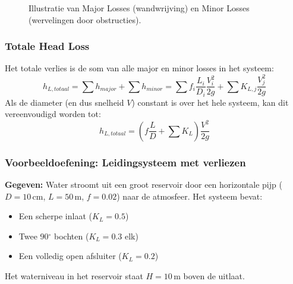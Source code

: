 \documentclass[a4paper,11pt,twoside]{report}
\begin{document}
\begin{figure}[H]
    \centering
    \caption{Illustratie van Major Losses (wandwrijving) en Minor Losses (wervelingen door obstructies).}
    \label{fig:losses_concept}
\end{figure}

\subsubsection{Totale Head Loss}
Het totale verlies is de som van alle major en minor losses in het systeem:
\[ h_{L,totaal} = \sum h_{major} + \sum h_{minor} = \sum f_i \frac{L_i}{D_i} \frac{V_i^2}{2g} + \sum K_{L,j} \frac{V_j^2}{2g} \]
Als de diameter (en dus snelheid $V$) constant is over het hele systeem, kan dit vereenvoudigd worden tot:
\[ h_{L,totaal} = \left( f \frac{L}{D} + \sum K_L \right) \frac{V^2}{2g} \]

\subsubsection*{Voorbeeldoefening: Leidingsysteem met verliezen}
\textbf{Gegeven:} Water stroomt uit een groot reservoir door een horizontale pijp ($D=10\,\mathrm{cm}$, $L=50\,\mathrm{m}$, $f=0.02$) naar de atmosfeer. Het systeem bevat:
\begin{itemize}
    \item Een scherpe inlaat ($K_L=0.5$)
    \item Twee 90$^\circ$ bochten ($K_L=0.3$ elk)
    \item Een volledig open afsluiter ($K_L=0.2$)
\end{itemize}
Het waterniveau in het reservoir staat $H=10\,\mathrm{m}$ boven de uitlaat.
\end{document}
